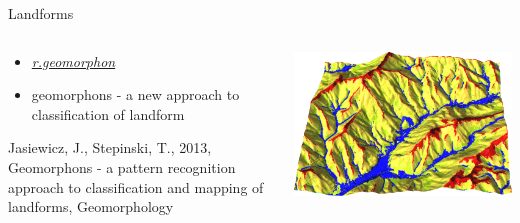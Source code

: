 \documentclass[xcolor={dvipsnames,usenames},beamer,aspectratio=169]{beamer}
\newcommand{\amodule}[1]{\href{http://grass.osgeo.org/grass70/manuals/addons/#1.html}{\emph{#1}}}
\begin{document}
\begin{frame}{Landforms}

\begin{columns}
\begin{column}{0.3\textwidth}

\begin{itemize}
  \item \amodule{r.geomorphon}
  \item geomorphons - a new approach to classification of landform\footnotemark[1]
\end{itemize}

\footnotesize
\footnotemark[1]
Jasiewicz, J., Stepinski, T., 2013,
Geomorphons - a pattern recognition approach to classification and mapping of landforms, Geomorphology%

\end{column}
\begin{column}{0.68\textwidth}

\begin{center}
  \includegraphics[width=\textwidth]{vis/geomorphon_3d}
\end{center}

\end{column}
\end{columns}

\end{frame}
\end{document}
